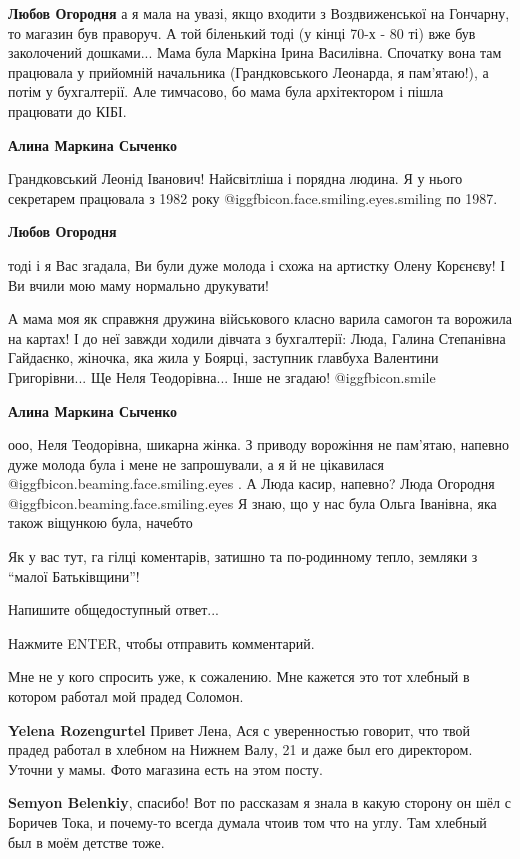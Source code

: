 \textbf{Любов Огородня} а я мала на увазі, якщо входити з Воздвиженської на Гончарну, то магазин був праворуч. А той біленький тоді (у кінці 70-х - 80 ті) вже був заколочений дошками...
Мама була Маркіна Ірина Василівна. Спочатку вона там працювала у прийомній
начальника (Грандковського Леонарда, я пам'ятаю!), а потім у бухгалтерії. Але
тимчасово, бо мама була архітектором і пішла працювати до КІБІ.

\textbf{Алина Маркина Сыченко} 

Грандковський Леонід Іванович! Найсвітліша і порядна людина. Я у нього
секретарем працювала з 1982 року @igg{fbicon.face.smiling.eyes.smiling}  по 1987.

\textbf{Любов Огородня} 

тоді і я Вас згадала, Ви були дуже молода і схожа на артистку Олену Корєнєву! І
Ви вчили мою маму нормально друкувати!

А мама моя як справжня дружина військового класно варила самогон та ворожила на
картах! І до неї завжди ходили дівчата з бухгалтерії: Люда, Галина Степанівна
Гайдаєнко, жіночка, яка жила у Боярці, заступник главбуха Валентини
Григорівни... Ще Неля Теодорівна... Інше не згадаю! @igg{fbicon.smile} 

\textbf{Алина Маркина Сыченко} 

ооо, Неля Теодорівна, шикарна жінка. З приводу ворожіння не пам'ятаю, напевно
дуже молода була і мене не запрошували, а я й не цікавилася @igg{fbicon.beaming.face.smiling.eyes} . А Люда касир,
напевно? Люда Огородня @igg{fbicon.beaming.face.smiling.eyes}  Я знаю, що у нас була Ольга Іванівна, яка також
віщункою була, начебто

Як у вас тут, га гілці коментарів, затишно та по-родинному тепло, земляки з \enquote{малої Батьківщини}!

Напишите общедоступный ответ...

Нажмите ENTER, чтобы отправить комментарий.

Мне не у кого спросить уже, к сожалению. Мне кажется это тот хлебный в котором
работал мой прадед Соломон.

\textbf{Yelena Rozengurtel} Привет Лена, Ася с уверенностью говорит, что твой прадед работал в хлебном на Нижнем Валу, 21 и даже был его директором. Уточни у мамы. Фото магазина есть на этом посту.

\textbf{Semyon Belenkiy}, спасибо! Вот по рассказам я знала в какую сторону он шёл с Боричев Тока, и почему-то всегда думала чтоив том что на углу. Там хлебный был в моём детстве тоже.

